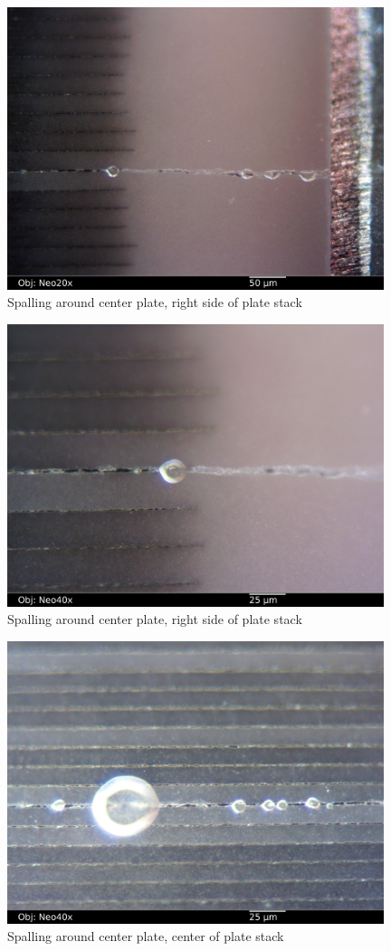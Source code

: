 \documentclass{article}
\begin{document}
\begin{figure}[h]
\includegraphics[width=11cm,keepaspectratio]{section2_07_df_neo20x_annotated.jpg}
\caption{Spalling around center plate, right side of plate stack}
\label{spalling}
\end{figure}

\begin{figure}[h]
\includegraphics[width=11cm,keepaspectratio]{section2_09_bf_neo40x_annotated.jpg}
\caption{Spalling around center plate, right side of plate stack}
\label{spalling2}
\end{figure}

\begin{figure}[h]
\includegraphics[width=11cm,keepaspectratio]{section2_10_df_neo40x_annotated.jpg}
\caption{Spalling around center plate, center of plate stack}
\label{spalling3}
\end{figure}
\end{document}
